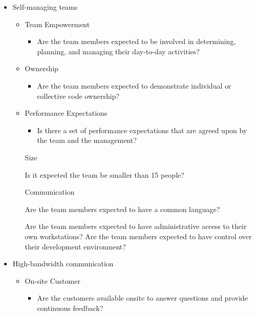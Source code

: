 \begin{appendices}
\begin{itemize}
\begin{itemize}
\begin{itemize}
				\end{itemize}
		\end{itemize}
	\item Self-managing teams
		\begin{itemize}
			\item Team Empowerment
				\begin{itemize}
					\item Are the team members expected to be involved in determining, planning, and managing their day-to-day activities?
				\end{itemize}
			\item Ownership
				\begin{itemize}
					\item Are the team members expected to demonstrate individual or collective code ownership? 
				\end{itemize}
			\item Performance Expectations
				\begin{itemize}
					\item Is there a set of performance expectations that are agreed upon by the team and the management?
				\end{itemize}
			\addition Size
				\begin{itemize}
					\addition Is it expected the team be smaller than 15 people?
				\end{itemize}
			\addition Communication
				\begin{itemize}
					\addition Are the team members expected to have a common language?
				\end{itemize}
			\addition{System Administration}
				\begin{itemize}
					\addition Are the team members expected to have administrative access to their own workstations?
					\addition Are the team members expected to have control over their development environment?	
				\end{itemize}
		\end{itemize}
	\item High-bandwidth communication
		\begin{itemize}
			\item On-site Customer
				\begin{itemize}
					\item Are the customers available onsite to answer questions and provide continuous feedback? 

\end{itemize}
\end{itemize}
\end{itemize}
\end{appendices}
